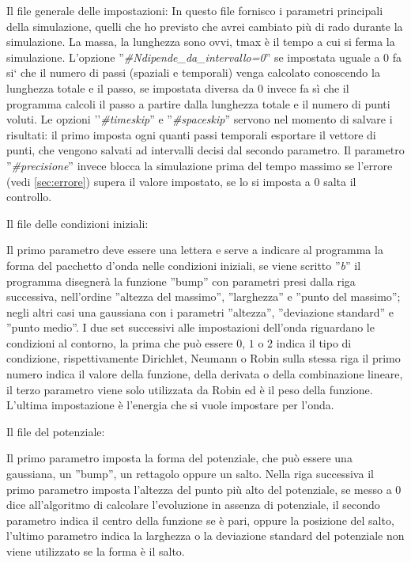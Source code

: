 Il file generale delle impostazioni:
\label{lst:settings}
In questo file fornisco i parametri principali della simulazione, quelli che ho previsto che avrei cambiato pi\`u di rado durante la simulazione. La massa, la lunghezza sono ovvi, tmax \`e il tempo a cui si ferma la simulazione. L'opzione ''\textit{\#Ndipende\_da\_intervallo=0}'' se impostata uguale a $0$ fa si` che il numero di passi (spaziali e temporali) venga calcolato conoscendo la lunghezza totale e il passo, se impostata diversa da $0$ invece fa s\`i che il programma calcoli il passo a partire dalla lunghezza totale e il numero di punti voluti. Le opzioni ''\textit{\#timeskip}'' e ''\textit{\#spaceskip}'' servono nel momento di salvare i risultati: il primo imposta ogni quanti passi temporali esportare il vettore di punti, che vengono salvati ad intervalli decisi dal secondo parametro. Il parametro ''\textit{\#precisione}'' invece blocca la simulazione prima del tempo massimo se l'errore (vedi \autoref{sec:errore}) supera il valore impostato, se lo si imposta a 0 salta il controllo.

Il file delle condizioni iniziali:

Il primo parametro deve essere una lettera e serve a indicare al programma la forma del pacchetto d'onda nelle condizioni iniziali, se viene scritto ''\textit{b}'' il programma disegner\`a la funzione ''bump'' con parametri presi dalla riga successiva, nell'ordine ''altezza del massimo'', ''larghezza'' e ''punto del massimo''; negli altri casi una gaussiana con i parametri ''altezza'', ''deviazione standard'' e ''punto medio''. I due set successivi alle impostazioni dell'onda riguardano le condizioni al contorno, la prima che pu\`o essere $0$, $1$ o $2$ indica il tipo di condizione, rispettivamente Dirichlet, Neumann o Robin sulla stessa riga il primo numero indica il valore della funzione, della derivata o della combinazione lineare, il terzo parametro viene solo utilizzata da Robin ed \`e il peso della funzione.
L'ultima impostazione \`e l'energia che si vuole impostare per l'onda.

Il file del potenziale:

Il primo parametro imposta la forma del potenziale, che pu\`o essere una gaussiana, un ''bump'', un rettagolo oppure un salto.
Nella riga successiva il primo parametro imposta l'altezza  del punto pi\`u alto del potenziale, se messo a 0 dice all'algoritmo di calcolare l'evoluzione in assenza di potenziale, il secondo parametro indica il centro della funzione se \`e pari, oppure la posizione del salto, l'ultimo parametro indica la larghezza o la deviazione standard del potenziale non viene utilizzato se la forma \`e il salto.
